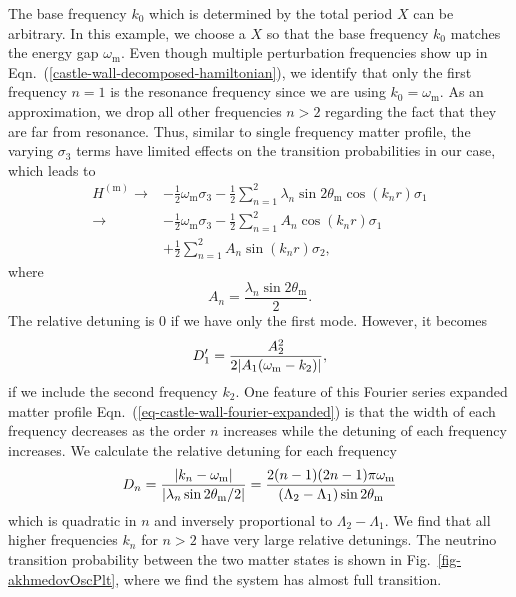 The base frequency $k_0$ which is determined by the total period $X$ can be arbitrary. In this example, we choose a $X$ so that the base frequency $k_0$ matches the energy gap $\omega_{\mathrm{m}}$. Even though multiple perturbation frequencies show up in Eqn.~(\ref{castle-wall-decomposed-hamiltonian}), we identify that only the first frequency $n=1$ is the resonance frequency since we are using $k_0=\omega_{\mathrm{m}}$. As an approximation, we drop all other frequencies $n>2$ regarding the fact that they are far from resonance. Thus, similar to single frequency matter profile, the varying $\sigma_3$ terms have limited effects on the transition probabilities in our case, which leads to
\begin{align*}
    H^{(\mathrm m)} \to & - \frac{1}{2}\omega_{\mathrm m} \sigma_3  - \frac{1}{2} \sum_{n=1}^2\lambda_n \sin 2\theta_{\mathrm m}  \cos\left( k_n r \right) \sigma_1\\
    \to & - \frac{1}{2}\omega_{\mathrm m} \sigma_3  - \frac{1}{2} \sum_{n=1}^2 A_n \cos ( k_n r) \sigma_1 \\
    & + \frac{1}{2} \sum_{n=1}^2A_n \sin(k_n r) \sigma_2,
\end{align*}
where
\begin{equation*}
A_n = \frac{\lambda_n \sin 2\theta_{\mathrm m} }{2} .
\end{equation*}
The relative detuning is $0$ if we have only the first mode. However, it becomes
\begin{equation}
D_1'= \frac{A_2^2}{2\lvert A_1 (\omega_{\mathrm m} - k_2) \rvert},
\end{equation}
if we include the second frequency $k_2$. One feature of this Fourier series expanded matter profile Eqn.~(\ref{eq-castle-wall-fourier-expanded}) is that the width of each frequency decreases as the order $n$ increases while the detuning of each frequency increases. We calculate the relative detuning for each frequency
\begin{equation}
D_n = \frac{\lvert k_n -\omega_{\mathrm m} \rvert}{ \lvert \lambda_n  \sin 2\theta_{\mathrm m}/2 \rvert } = \frac{2(n-1)(2n-1)\pi \omega_{\mathrm m}}{(\Lambda_2 - \Lambda_1)\sin 2\theta_{\mathrm m}}
\end{equation}
which is quadratic in $n$ and inversely proportional to $\Lambda_2-\Lambda_1$. We find that all higher frequencies $k_n$ for $n>2$ have very large relative detunings. The neutrino transition probability between the two matter states is shown in Fig.~\ref{fig-akhmedovOscPlt}, where we find the system has almost full transition.

